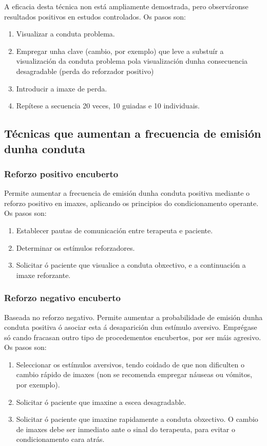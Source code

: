 \documentclass[a4paper,11pt]{article}
\begin{document}
A eficacia desta técnica non está ampliamente demostrada, pero observáronse resultados positivos en estudos controlados. Os pasos son:
\begin{enumerate}
	\item Visualizar a conduta problema.
	\item Empregar unha clave (cambio, por exemplo) que leve a substuír a visualización da conduta 
	problema pola visualización dunha consecuencia desagradable (perda do reforzador positivo)
	\item Introducir a imaxe de perda. 
	\item Repítese a secuencia 20 veces, 10 guiadas e 10 individuais. 
\end{enumerate}

\subsection{Técnicas que aumentan a frecuencia de emisión dunha conduta}
\subsubsection{Reforzo positivo encuberto}
Permite aumentar a frecuencia de emisión dunha conduta positiva mediante o reforzo positivo en imaxes, aplicando os principios do condicionamento operante. Os pasos son:
\begin{enumerate}
	\item Establecer pautas de comunicación entre terapeuta e paciente.
	\item Determinar os estímulos reforzadores.
	\item Solicitar ó paciente que visualice a conduta obxectivo, e a continuación a imaxe 
	reforzante.
\end{enumerate}

\subsubsection{Reforzo negativo encuberto}
Baseada no reforzo negativo. Permite aumentar a probabilidade de emisión dunha conduta positiva ó asociar esta á desaparición dun estímulo aversivo. Emprégase só cando fracasan outro tipo de procedementos encubertos, por ser máis agresivo. Os pasos son:
\begin{enumerate}
	\item Seleccionar os estímulos aversivos, tendo coidado de que non dificulten o cambio rápido de 
	imaxes (non se recomenda empregar náuseas ou vómitos, por exemplo).
	\item Solicitar ó paciente que imaxine a escea desagradable.
	\item Solicitar ó paciente que imaxine rapidamente a conduta obxectivo. O cambio de imaxes debe 
	ser inmediato ante o sinal do terapeuta, para evitar o condicionamento cara atrás. 
\end{enumerate}
\end{document}
